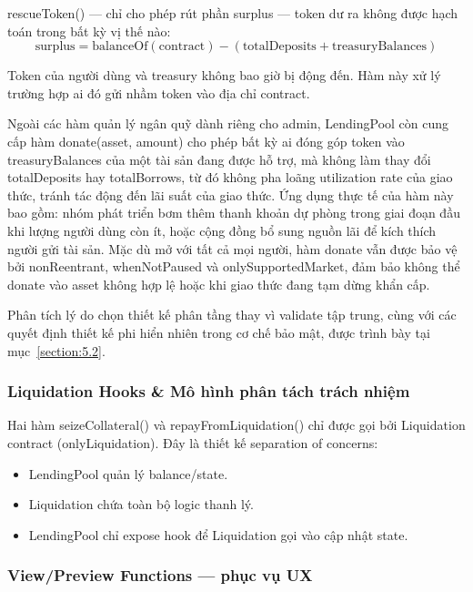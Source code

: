 \documentclass[../DoAn.tex]{subfiles}
\begin{document}
rescueToken() --- chỉ cho phép rút phần surplus --- token dư ra không được hạch toán trong bất kỳ vị thế nào:
\begin{equation}
\mathrm{surplus} = \mathrm{balanceOf(contract)} - (\mathrm{totalDeposits} + \mathrm{treasuryBalances})
\label{eq:rescue_surplus}
\end{equation}


Token của người dùng và treasury không bao giờ bị động đến. Hàm này xử lý trường hợp ai đó gửi nhầm token vào địa chỉ contract.

Ngoài các hàm quản lý ngân quỹ dành riêng cho admin, LendingPool còn cung cấp hàm donate(asset, amount) cho phép bất kỳ ai đóng góp token vào treasuryBalances của một tài sản đang được hỗ trợ, mà không làm thay đổi totalDeposits hay totalBorrows, từ đó không pha loãng utilization rate của giao thức, tránh tác động đến lãi suất của giao thức. Ứng dụng thực tế của hàm này bao gồm: nhóm phát triển bơm thêm thanh khoản dự phòng trong giai đoạn đầu khi lượng người dùng còn ít, hoặc cộng đồng bổ sung nguồn lãi để kích thích người gửi tài sản. Mặc dù mở với tất cả mọi người, hàm donate vẫn được bảo vệ bởi nonReentrant, whenNotPaused và onlySupportedMarket, đảm bảo không thể donate vào asset không hợp lệ hoặc khi giao thức đang tạm dừng khẩn cấp.

Phân tích lý do chọn thiết kế phân tầng thay vì validate tập trung, cùng với các quyết định thiết kế phi hiển nhiên trong cơ chế bảo mật, được trình bày tại mục~\ref{section:5.2}.

\subsubsection{Liquidation Hooks \& Mô hình phân tách trách nhiệm}


Hai hàm seizeCollateral() và repayFromLiquidation() chỉ được gọi bởi Liquidation contract (onlyLiquidation). Đây là thiết kế separation of concerns:

\begin{itemize}
  \item LendingPool quản lý balance/state.
  \item Liquidation chứa toàn bộ logic thanh lý.
  \item LendingPool chỉ expose hook để Liquidation gọi vào cập nhật state.
\end{itemize}


\subsubsection{View/Preview Functions --- phục vụ UX}
\end{document}
